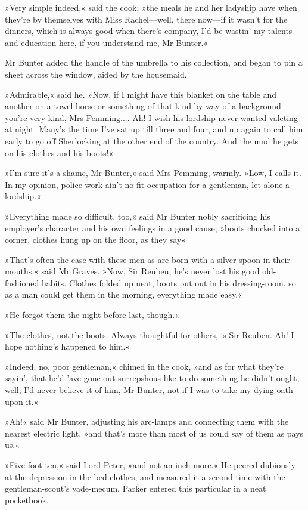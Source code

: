 »Very simple indeed,« said the cook; »the meals he and her ladyship have when they're by themselves with Miss Rachel\allowbreak---\allowbreak well, there now\allowbreak---\allowbreak if it wasn't for the dinners, which is always good when there's company, I'd be wastin' my talents and education here, if you understand me, Mr Bunter.«

Mr Bunter added the handle of the umbrella to his collection, and began to pin a sheet across the window, aided by the housemaid.

»Admirable,« said he. »Now, if I might have this blanket on the table and another on a towel-horse or something of that kind by way of a background\allowbreak---\allowbreak you're very kind, Mrs Pemming.... Ah! I wish his lordship never wanted valeting at night. Many's the time I've sat up till three and four, and up again to call him early to go off Sherlocking at the other end of the country. And the mud he gets on his clothes and his boots!«

»I'm sure it's a shame, Mr Bunter,« said Mrs Pemming, warmly. »Low, I calls it. In my opinion, police-work ain't no fit occupation for a gentleman, let alone a lordship.«

»Everything made so difficult, too,« said Mr Bunter nobly sacrificing his employer's character and his own feelings in a good cause; »boots chucked into a corner, clothes hung up on the floor, as they say\longdash«

»That's often the case with these men as are born with a silver spoon in their mouths,« said Mr Graves. »Now, Sir Reuben, he's never lost his good old-fashioned habits. Clothes folded up neat, boots put out in his dressing-room, so as a man could get them in the morning, everything made easy.«

»He forgot them the night before last, though.«

»The clothes, not the boots. Always thoughtful for others, is Sir Reuben. Ah! I hope nothing's happened to him.«

»Indeed, no, poor gentleman,« chimed in the cook, »and as for what they're sayin', that he'd 'ave gone out surrepshous-like to do something he didn't ought, well, I'd never believe it of him, Mr Bunter, not if I was to take my dying oath upon it.«

»Ah!« said Mr Bunter, adjusting his arc-lamps and connecting them with the nearest electric light, »and that's more than most of us could say of them as pays us.«

»Five foot ten,« said Lord Peter, »and not an inch more.« He peered dubiously at the depression in the bed clothes, and measured it a second time with the gentleman-scout's vade-mecum. Parker entered this particular in a neat pocketbook.

